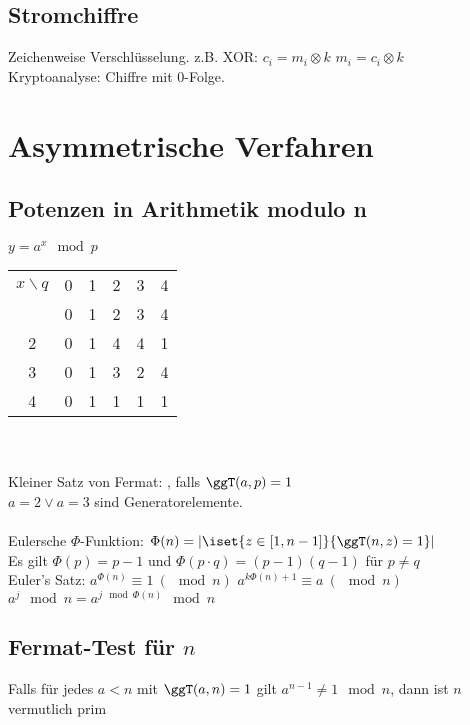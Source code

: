 \documentclass[fs]{latex4ei}
\begin{document}
\begin{multicols}{4}
	
	\subsection{Stromchiffre}
	Zeichenweise Verschlüsselung. z.B. XOR: $c_i = m_i \otimes k$ \quad $m_i = c_i \otimes k$\\
	Kryptoanalyse: Chiffre mit 0-Folge.


\section{Asymmetrische Verfahren}
	\subsection{Potenzen in Arithmetik modulo n}
	$y = a^x \mod p$\\
	\begin{tabular}{c|lllll}
	$x\backslash q$ & 0 & 1 & 2 & 3 & 4 \\ \mrule
	1 & 0 & 1 & 2 & 3 & 4 \\
	2 & 0 & 1 & 4 & 4 & 1 \\
	3 & 0 & 1 & 3 & 2 & 4 \\
	4 & 0 & 1 & 1 & 1 & 1 \\
	\end{tabular}\\
	\\
	Kleiner Satz von Fermat: , falls $\ggT(a,p)=1$\\
	$a = 2 \lor a = 3$ sind Generatorelemente.\\
	\\
	Eulersche $\Phi$-Funktion: $\Phi(n) = | \iset{ z \in [1,n-1]}{\ggT(n,z) = 1} |$\\
	Es gilt $\Phi(p) = p-1$ und $\Phi(p \cdot q) = (p-1)(q-1)$ für $p \ne q$\\
	Euler's Satz: $a^{\Phi(n)} \equiv 1\ (\!\!\!\!\mod n)$ \qquad $a^{k \Phi(n) + 1} \equiv a\ (\!\!\!\!\mod n)$\\ 
	$a^j \mod n = a^{j \mod \Phi(n)} \mod n$\\


	\subsection{Fermat-Test für $n$}
	Falls für jedes $a < n$ mit $\ggT(a,n) = 1$ gilt $a^{n-1} \ne 1 \mod n$, dann
	ist $n$ vermutlich prim 


\end{multicols}
\end{document}
